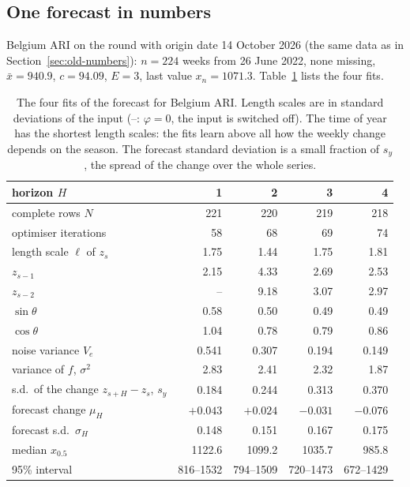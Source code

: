 \documentclass[11pt,a4paper]{article}
\newcommand{\ve}{V_e}
\numberwithin{equation}{section}
\begin{document}
\subsection{One forecast in numbers}
\label{sec:direct-numbers}
Belgium ARI on the round with origin date 14 October 2026 (the same data as in
Section~\ref{sec:old-numbers}): $n=224$ weeks from 26 June 2022, none missing, $\bar x=940.9$,
$c=94.09$, $E=3$, last value $x_n=1071.3$. Table~\ref{tab:direct} lists the four fits.

\begin{table}[htbp]
\centering\small
\begin{tabular}{@{}lrrrr@{}}
\toprule
horizon $H$ & 1 & 2 & 3 & 4 \\
\midrule
complete rows $N$ & 221 & 220 & 219 & 218 \\
optimiser iterations & 58 & 68 & 69 & 74 \\
length scale $\ell$ of $z_s$ & 1.75 & 1.44 & 1.75 & 1.81 \\
\phantom{length scale $\ell$ of }$z_{s-1}$ & 2.15 & 4.33 & 2.69 & 2.53 \\
\phantom{length scale $\ell$ of }$z_{s-2}$ & -- & 9.18 & 3.07 & 2.97 \\
\phantom{length scale $\ell$ of }$\sin\theta$ & 0.58 & 0.50 & 0.49 & 0.49 \\
\phantom{length scale $\ell$ of }$\cos\theta$ & 1.04 & 0.78 & 0.79 & 0.86 \\
noise variance $\ve$ & 0.541 & 0.307 & 0.194 & 0.149 \\
variance of $f$, $\sigma^2$ & 2.83 & 2.41 & 2.32 & 1.87 \\
s.d.\ of the change $z_{s+H}-z_s$, $s_y$ & 0.184 & 0.244 & 0.313 & 0.370 \\
\midrule
forecast change $\mu_H$ & $+0.043$ & $+0.024$ & $-0.031$ & $-0.076$ \\
forecast s.d.\ $\sigma_H$ & 0.148 & 0.151 & 0.167 & 0.175 \\
median $\hat x_{0.5}$ & 1122.6 & 1099.2 & 1035.7 & 985.8 \\
95\% interval & 816--1532 & 794--1509 & 720--1473 & 672--1429 \\
\bottomrule
\end{tabular}
\caption{The four fits of the forecast for Belgium ARI. Length scales are in standard deviations of
the input (--: $\varphi=0$, the input is switched off). The time of year has the shortest length scales:
the fits learn above all how the weekly change depends on the season. The forecast standard
deviation is a small fraction of $s_y$, the spread of the change over the whole series.}
\label{tab:direct}
\end{table}
\end{document}

